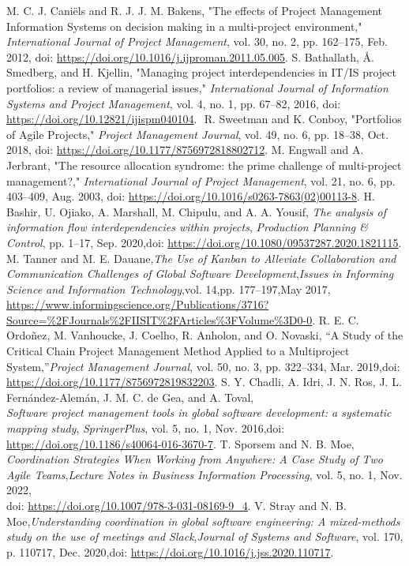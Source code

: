 \documentclass{llncs}
\begin{document}
\begin{thebibliography}{11}
  M. C. J. Caniëls and R. J. J. M. Bakens, "The effects of Project Management Information Systems on decision making in a multi-project environment," \textit{International Journal of Project Management}, vol. 30, no. 2, pp. 162–175, Feb. 2012, doi: \url{https://doi.org/10.1016/j.ijproman.2011.05.005}.
  S. Bathallath, Å. Smedberg, and H. Kjellin, "Managing project interdependencies in IT/IS project portfolios: a review of managerial issues," \textit{International Journal of Information Systems and Project Management}, vol. 4, no. 1, pp. 67–82, 2016, doi: \url{https://doi.org/10.12821/ijispm040104}.
‌
  R. Sweetman and K. Conboy, "Portfolios of Agile Projects," \textit{Project Management Journal}, vol. 49, no. 6, pp. 18–38, Oct. 2018, doi: \url{https://doi.org/10.1177/8756972818802712}.
 M. Engwall and A. Jerbrant, "The resource allocation syndrome: the prime challenge of multi-project management?," \textit{International Journal of Project Management}, vol. 21, no. 6, pp. 403–409, Aug. 2003, doi: \url{https://doi.org/10.1016/s0263-7863(02)00113-8}.
H. Bashir, U. Ojiako, A. Marshall, M. Chipulu, and A. A. Yousif,
\textit{The analysis of information flow interdependencies within projects},
\textit{Production Planning \& Control}, pp. 1–17, Sep. 2020,doi: \url{https://doi.org/10.1080/09537287.2020.1821115}.
 M. Tanner and M. E. Dauane,\textit{The Use of Kanban to Alleviate Collaboration and Communication Challenges of Global Software Development},\textit{Issues in Informing Science and Information Technology},vol. 14,pp. 177–197,May 2017,
\url{https://www.informingscience.org/Publications/3716?Source=%2FJournals%2FIISIT%2FArticles%3FVolume%3D0-0}.
R. E. C. Ordoñez, M. Vanhoucke, J. Coelho, R. Anholon, and O. Novaski,
``A Study of the Critical Chain Project Management Method Applied to a Multiproject System,''\emph{Project Management Journal}, vol. 50, no. 3, pp. 322–334, Mar. 2019,doi: \url{https://doi.org/10.1177/8756972819832203}.
S. Y. Chadli, A. Idri, J. N. Ros, J. L. Fernández-Alemán, J. M. C. de Gea, and A. Toval, \\ \emph{Software project management tools in global software development: a systematic mapping study}, \emph{SpringerPlus}, vol. 5, no. 1, Nov. 2016,doi: \url{https://doi.org/10.1186/s40064-016-3670-7}.
T. Sporsem and N. B. Moe, \emph{Coordination Strategies When Working from Anywhere: A Case Study of Two Agile Teams},\emph{Lecture Notes in Business Information Processing}, vol. 5, no. 1, Nov. 2022, \\
doi: \url{https://doi.org/10.1007/978-3-031-08169-9_4}.
V. Stray and N. B. Moe,\emph{Understanding coordination in global software engineering: A mixed-methods study on the use of meetings and Slack},\emph{Journal of Systems and Software}, vol. 170, p. 110717, Dec. 2020,doi: \url{https://doi.org/10.1016/j.jss.2020.110717}.‌

\end{thebibliography}
\end{document}
